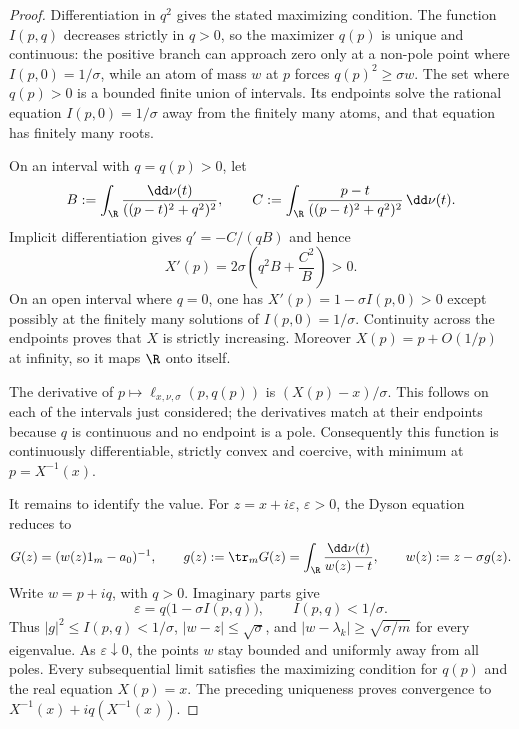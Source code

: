 \begin{proof}
Differentiation in $q^2$ gives the stated maximizing condition.
The function $I(p,q)$ decreases strictly in $q>0$, so the maximizer $q(p)$ is unique and continuous: the positive branch can approach zero only at a non-pole point where $I(p,0)=1/\sigma$, while an atom of mass $w$ at $p$ forces $q(p)^2\ge\sigma w$.
The set where $q(p)>0$ is a bounded finite union of intervals.
Its endpoints solve the rational equation $I(p,0)=1/\sigma$ away from the finitely many atoms, and that equation has finitely many roots.

On an interval with $q=q(p)>0$, let
\[
 B:=\int_\R\frac{\dd\nu(t)}{((p-t)^2+q^2)^2},
 \qquad
 C:=\int_\R\frac{p-t}{((p-t)^2+q^2)^2}\,\dd\nu(t).
\]
Implicit differentiation gives $q'=-C/(qB)$ and hence
\begin{equation}\label{eq:minmax-isotropic-monotonicity}
 X'(p)=2\sigma\left(q^2B+\frac{C^2}{B}\right)>0.
\end{equation}
On an open interval where $q=0$, one has $X'(p)=1-\sigma I(p,0)>0$ except possibly at the finitely many solutions of $I(p,0)=1/\sigma$.
Continuity across the endpoints proves that $X$ is strictly increasing.
Moreover $X(p)=p+O(1/p)$ at infinity, so it maps $\R$ onto itself.

The derivative of $p\mapsto\ell_{x,\nu,\sigma}(p,q(p))$ is $(X(p)-x)/\sigma$.
This follows on each of the intervals just considered; the derivatives match at their endpoints because $q$ is continuous and no endpoint is a pole.
Consequently this function is continuously differentiable, strictly convex and coercive, with minimum at $p=X^{-1}(x)$.

It remains to identify the value.
For $z=x+i\varepsilon$, $\varepsilon>0$, the Dyson equation reduces to
\begin{equation}\label{eq:minmax-isotropic-dyson}
 G(z)=(w(z)1_m-a_0)^{-1},\qquad
 g(z):=\tr_mG(z)=\int_\R\frac{\dd\nu(t)}{w(z)-t},\qquad
 w(z):=z-\sigma g(z).
\end{equation}
Write $w=p+iq$, with $q>0$.
Imaginary parts give
\[
 \varepsilon=q\bigl(1-\sigma I(p,q)\bigr),
 \qquad I(p,q)<1/\sigma.
\]
Thus $|g|^2\le I(p,q)<1/\sigma$, $|w-z|\le\sqrt\sigma$, and $|w-\lambda_k|\ge\sqrt{\sigma/m}$ for every eigenvalue.
As $\varepsilon\downarrow0$, the points $w$ stay bounded and uniformly away from all poles.
Every subsequential limit satisfies the maximizing condition for $q(p)$ and the real equation $X(p)=x$.
The preceding uniqueness proves convergence to $X^{-1}(x)+i q(X^{-1}(x))$.


\end{proof}

